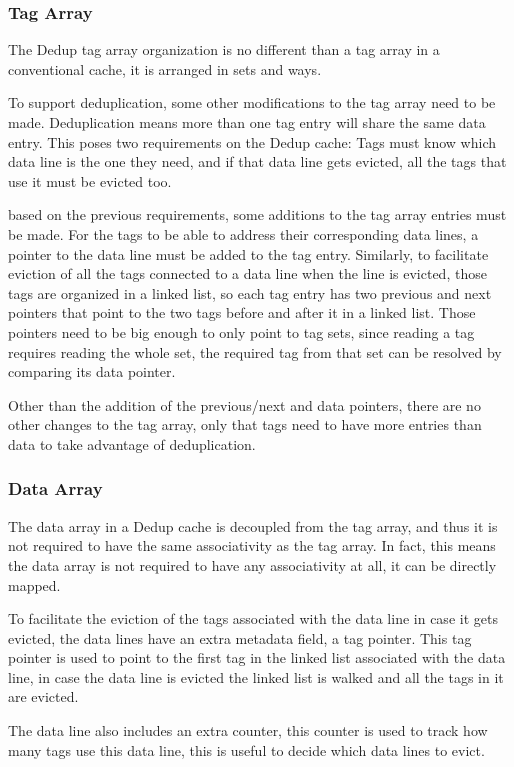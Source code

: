 \subsubsection{Tag Array}
\label{sssec:DedupTag}
The Dedup tag array organization is no different than a tag array in a conventional cache, it is arranged in sets and ways.\par
To support deduplication, some other modifications to the tag array need to be made. Deduplication means more than one tag entry will share the same data entry. This poses two requirements on the Dedup cache: Tags must know which data line is the one they need, and if that data line gets evicted, all the tags that use it must be evicted too.\par
based on the previous requirements, some additions to the tag array entries must be made. For the tags to be able to address their corresponding data lines, a pointer to the data line must be added to the tag entry. Similarly, to facilitate eviction of all the tags connected to a data line when the line is evicted, those tags are organized in a linked list, so each tag entry has two previous and next pointers that point to the two tags before and after it in a linked list. Those pointers need to be big enough to only point to tag sets, since reading a tag requires reading the whole set, the required tag from that set can be resolved by comparing its data pointer.\par
Other than the addition of the previous/next and data pointers, there are no other changes to the tag array, only that tags need to have more entries than data to take advantage of deduplication.
\subsubsection{Data Array}
\label{sssec:DedupData}
The data array in a Dedup cache is decoupled from the tag array, and thus it is not required to have the same associativity as the tag array. In fact, this means the data array is not required to have any associativity at all, it can be directly mapped.\par
To facilitate the eviction of the tags associated with the data line in case it gets evicted, the data lines have an extra metadata field, a tag pointer. This tag pointer is used to point to the first tag in the linked list associated with the data line, in case the data line is evicted the linked list is walked and all the tags in it are evicted.\par
The data line also includes an extra counter, this counter is used to track how many tags use this data line, this is useful to decide which data lines to evict.
